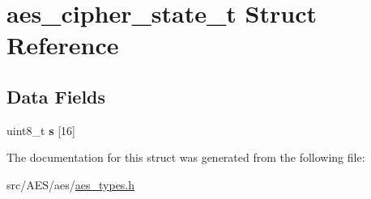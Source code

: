 \hypertarget{structaes__cipher__state__t}{\section{aes\-\_\-cipher\-\_\-state\-\_\-t Struct Reference}
\label{structaes__cipher__state__t}
}
\subsection*{Data Fields}
\begin{DoxyCompactItemize}
\item 
\hypertarget{structaes__cipher__state__t_ae9267f97d76009b78c1502fc433d0f97}{uint8\-\_\-t {\bfseries s} \mbox{[}16\mbox{]}}\label{structaes__cipher__state__t_ae9267f97d76009b78c1502fc433d0f97}

\end{DoxyCompactItemize}


The documentation for this struct was generated from the following file\-:\begin{DoxyCompactItemize}
\item 
src/\-A\-E\-S/aes/\hyperlink{aes__types_8h}{aes\-\_\-types.\-h}\end{DoxyCompactItemize}
